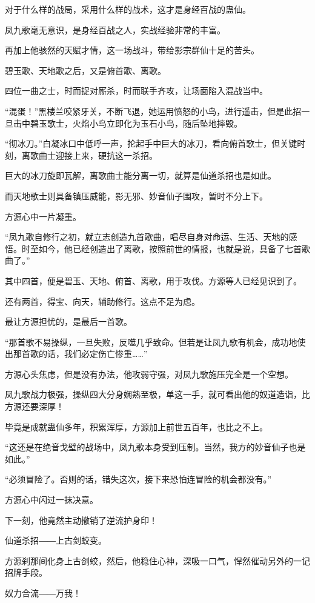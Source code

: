 \begin{this_body}
对于什么样的战局，采用什么样的战术，这才是身经百战的蛊仙。

凤九歌毫无意识，是身经百战之人，实战经验非常的丰富。

再加上他骇然的天赋才情，这一场战斗，带给影宗群仙十足的苦头。

碧玉歌、天地歌之后，又是俯首歌、离歌。

四位一曲之士，时而捉对厮杀，时而联手齐攻，让场面陷入混战当中。

“混蛋！”黑楼兰咬紧牙关，不断飞退，她运用愤怒的小鸟，进行遥击，但是此招一旦击中碧玉歌士，火焰小鸟立即化为玉石小鸟，随后坠地摔毁。

“彻冰刀。”白凝冰口中低呼一声，抡起手中巨大的冰刀，看向俯首歌士，但关键时刻，离歌曲士迎接上来，硬抗这一杀招。

巨大的冰刀旋即瓦解，离歌曲士能分离一切，就算是仙道杀招也是如此。

而天地歌士则具备镇压威能，影无邪、妙音仙子围攻，暂时不分上下。

方源心中一片凝重。

“凤九歌自修行之初，就立志创造九首歌曲，唱尽自身对命运、生活、天地的感悟。时至如今，他已经创造出了离歌，按照前世的情报，也就是说，具备了七首歌曲了。”

其中四首，便是碧玉、天地、俯首、离歌，用于攻伐。方源等人已经见识到了。

还有两首，得宝、向天，辅助修行。这点不足为虑。

最让方源担忧的，是最后一首歌。

“那首歌不易操纵，一旦失败，反噬几乎致命。但若是让凤九歌有机会，成功地使出那首歌的话，我们必定伤亡惨重……”

方源心头焦虑，但是没有办法，他攻弱守强，对凤九歌施压完全是一个空想。

凤九歌战力极强，操纵四大分身娴熟至极，单这一手，就可看出他的奴道造诣，比方源还要深厚！

毕竟是成就蛊仙多年，积累浑厚，方源加上前世五百年，也比之不上。

“这还是在绝音戈壁的战场中，凤九歌本身受到压制。当然，我方的妙音仙子也是如此。”

“必须冒险了。否则的话，错失这次，接下来恐怕连冒险的机会都没有。”

方源心中闪过一抹决意。

下一刻，他竟然主动撤销了逆流护身印！

仙道杀招――上古剑蛟变。

方源刹那间化身上古剑蛟，然后，他稳住心神，深吸一口气，悍然催动另外的一记招牌手段。

奴力合流――万我！


\end{this_body}
